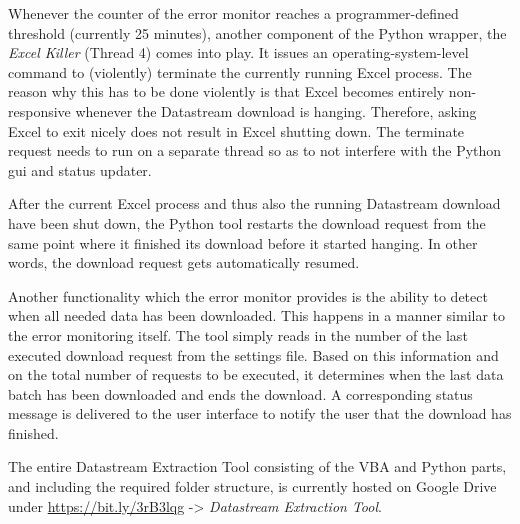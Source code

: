 Whenever the counter of the error monitor reaches a programmer-defined threshold (currently 25 minutes), another component of the Python wrapper, the \textit{Excel Killer} (Thread 4) comes into play. It issues an operating-system-level command to (violently) terminate the currently running Excel process. The reason why this has to be done violently is that Excel becomes entirely non-responsive whenever the Datastream download is hanging. Therefore, asking Excel to exit nicely does not result in Excel shutting down. The terminate request needs to run on a separate thread so as to not interfere with the Python gui and status updater. 

After the current Excel process and thus also the running Datastream download have been shut down, the Python tool restarts the download request from the same point where it finished its download before it started hanging. In other words, the download request gets automatically resumed. 

Another functionality which the error monitor provides is the ability to detect when all needed data has been downloaded. This happens in a manner similar to the error monitoring itself. The tool simply reads in the number of the last executed download request from the settings file. Based on this information and on the total number of requests to be executed, it determines when the last data batch has been downloaded and ends the download. A corresponding status message is delivered to the user interface to notify the user that the download has finished. 

The entire Datastream Extraction Tool consisting of the VBA and Python parts, and including the required folder structure, is currently hosted on Google Drive under \url{https://bit.ly/3rB3lqg} -> \textit{Datastream Extraction Tool}.  




